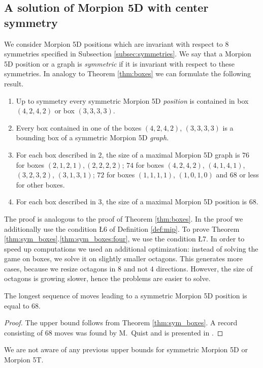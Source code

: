 \subsection{A solution of Morpion 5D with center symmetry}
We consider Morpion 5D positions which are invariant with respect to $8$ symmetries 
specified in Subsection \ref{subsec:symmetries}. We say that a Morpion 5D position or a graph is {\em symmetric} if it is invariant with respect to these symmetries.  
In analogy to Theorem \ref{thm:boxes} we can formulate the following result. 
\begin{theorem}
\begin{enumerate}
\item Up to symmetry every symmetric Morpion 5D {\em position} is contained in box
$(4, 2, 4, 2)$ or box $(3, 3, 3, 3)$.
\item Every box contained in one of the boxes $(4, 2, 4, 2)$, $(3, 3, 3, 3)$ is a bounding box of a symmetric Morpion 5D {\em graph}.
\item For each box described in $2$, the size of a maximal Morpion 5D graph is $76$ for boxes $(2, 1, 2, 1), (2, 2, 2, 2)$; $74$ for boxes $(4,2,4,2)$, $(4,1,4,1)$, $(3,2,3,2)$, $(3,1,3,1)$; $72$ for boxes $(1,1,1,1)$, $(1,0,1,0)$ and $68$ or less for other boxes.
\item For each box described in $3$, the size of a maximal Morpion 5D position is $68$. \label{thm:sym_boxes:four}
\end{enumerate} 
\label{thm:sym_boxes}
\end{theorem}

The proof is analogous to the proof of Theorem \ref{thm:boxes}. In the proof we additionally use the condition \L{6} of Definition \ref{def:mip}. To prove Theorem \ref{thm:sym_boxes}.\ref{thm:sym_boxes:four}, we use the condition \L{7}. In order to speed up computations we used an additional optimization: instead of solving the game on boxes, we solve it on slightly smaller octagons. This generates more cases, because we resize octagons in $8$ and not $4$ directions. However, the size of octagons is growing slower, hence the problems are easier to solve.  

\begin{corollary}
\label{cor:68}
The longest sequence of moves leading to a symmetric Morpion 5D position is equal to $68$.
\end{corollary}
\begin{proof} 
The upper bound follows from Theorem \ref{thm:sym_boxes}.
A record consisting of $68$ moves was found by M.~Quist and is presented in \cite{boyer}. %
\end{proof}
We are not aware of any previous upper bounds for symmetric Morpion 5D or Morpion 5T.

